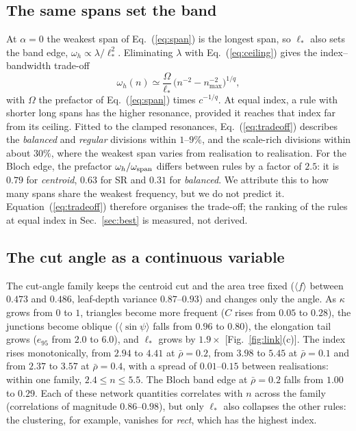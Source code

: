 \documentclass[aps,pre,twocolumn,superscriptaddress,amsmath,amssymb,floatfix]{revtex4-2}
\begin{document}
\subsection{The same spans set the band}
At $\alpha=0$ the weakest span of Eq.~(\ref{eq:span}) is the longest span, so $\ell_*$
also sets the band edge, $\omega_h\propto\lambda/\ell_*^2$. Eliminating $\lambda$ with
Eq.~(\ref{eq:ceiling}) gives the index--bandwidth trade-off
\begin{equation}
\omega_h(n)\simeq\frac{\Omega}{\ell_*}\,\bigl(n^{-2}-n_{\max}^{-2}\bigr)^{1/q},
\label{eq:tradeoff}
\end{equation}
with $\Omega$ the prefactor of Eq.~(\ref{eq:span}) times $c^{-1/q}$. At equal index, a
rule with shorter long spans has the higher resonance, provided it reaches that index far
from its ceiling. Fitted to the clamped resonances, Eq.~(\ref{eq:tradeoff}) describes the
\emph{balanced} and \emph{regular} divisions within $1$--$9\%$, and the scale-rich
divisions within about $30\%$, where the weakest span varies from realisation to
realisation. For the Bloch edge, the prefactor $\omega_h/\omega_{\rm span}$ differs between
rules by a factor of $2.5$: it is $0.79$ for \emph{centroid}, $0.63$ for SR and $0.31$ for
\emph{balanced}. We attribute this to how many spans share the weakest frequency, but we do
not predict it. Equation~(\ref{eq:tradeoff}) therefore organises the trade-off; the ranking
of the rules at equal index in Sec.~\ref{sec:best} is measured, not derived.

\subsection{The cut angle as a continuous variable}
The cut-angle family keeps the centroid cut and the area tree fixed ($\langle f\rangle$
between $0.473$ and $0.486$, leaf-depth variance $0.87$--$0.93$) and changes only the
angle. As $\kappa$ grows from $0$ to $1$, triangles become more frequent ($C$ rises from
$0.05$ to $0.28$), the junctions become oblique ($\langle\sin\psi\rangle$ falls from $0.96$
to $0.80$), the elongation tail grows ($e_{95}$ from $2.0$ to $6.0$), and $\ell_*$ grows by
$1.9\times$ [Fig.~\ref{fig:link}(c)]. The index rises monotonically, from $2.94$ to $4.41$ at
$\bar\rho=0.2$, from $3.98$ to $5.45$ at $\bar\rho=0.1$ and from $2.37$ to $3.57$ at
$\bar\rho=0.4$, with a spread of $0.01$--$0.15$ between realisations: within one family,
$2.4\le n\le5.5$. The Bloch band edge at $\bar\rho=0.2$ falls from $1.00$ to $0.29$. Each
of these network quantities correlates with $n$ across the family (correlations of
magnitude $0.86$--$0.98$), but only $\ell_*$ also collapses the other rules: the clustering,
for example, vanishes for \emph{rect}, which has the highest index.
\end{document}
